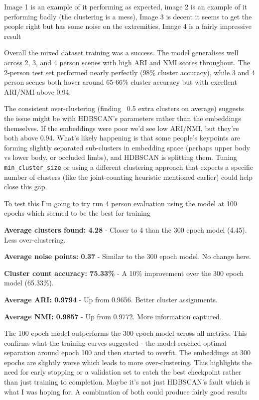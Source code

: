 Image 1 is an example of it performing as expected, image 2 is an example of it performing badly (the clustering is a mess),
Image 3 is decent it seems to get the people right but has some noise on the extremities, Image 4 is a fairly impressive result

Overall the mixed dataset training was a success. The model generalises well
across 2, 3, and 4 person scenes with high ARI and NMI scores throughout. The
2-person test set performed nearly perfectly (98\% cluster accuracy), while 3
and 4 person scenes both hover around 65-66\% cluster accuracy but with
excellent ARI/NMI above 0.94.

The consistent over-clustering (finding ~0.5 extra clusters on average)
suggests the issue might be with HDBSCAN's parameters rather than the
embeddings themselves. If the embeddings were poor we'd see low ARI/NMI, but
they're both above 0.94. What's likely happening is that some people's
keypoints are forming slightly separated sub-clusters in embedding space
(perhaps upper body vs lower body, or occluded limbs), and HDBSCAN is splitting
them. Tuning \texttt{min\_cluster\_size} or using a different clustering
approach that expects a specific number of clusters (like the joint-counting
heuristic mentioned earlier) could help close this gap.

To test this I'm going to try run 4 person evaluation using the model at 100 epochs
which seemed to be the best for training

\begin{compactitem}
\item \textbf{Average clusters found: 4.28} - Closer to 4 than the 300 epoch model (4.45). Less over-clustering.

\item \textbf{Average noise points: 0.37} - Similar to the 300 epoch model. No change here.

\item \textbf{Cluster count accuracy: 75.33\%} - A 10\% improvement over the 300 epoch model (65.33\%).

\item \textbf{Average ARI: 0.9794} - Up from 0.9656. Better cluster assignments.

\item \textbf{Average NMI: 0.9857} - Up from 0.9772. More information captured.
\end{compactitem}

The 100 epoch model outperforms the 300 epoch model across all metrics. This
confirms what the training curves suggested - the model reached optimal
separation around epoch 100 and then started to overfit. The embeddings at 300
epochs are slightly worse which leads to more over-clustering. This highlights
the need for early stopping or a validation set to catch the best checkpoint
rather than just training to completion. Maybe it's not just HDBSCAN's fault which 
is what I was hoping for. A combination of both could produce fairly good results
